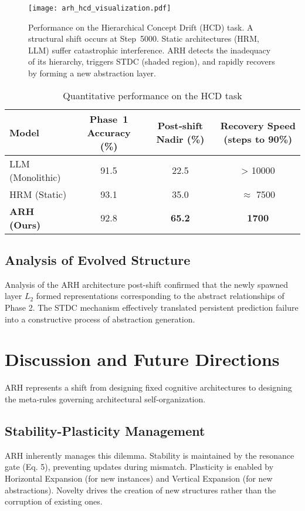 \documentclass{article}
\begin{document}
\begin{figure}[h!]
    \centering
    \texttt{[image: arh\_hcd\_visualization.pdf]}
    \caption{Performance on the Hierarchical Concept Drift (HCD) task. A structural shift occurs at Step~5000. Static architectures (HRM, LLM) suffer catastrophic interference. ARH detects the inadequacy of its hierarchy, triggers STDC (shaded region), and rapidly recovers by forming a new abstraction layer.}
    \label{fig:performance_plot}
\end{figure}

\begin{table}[h!]
\centering
\caption{Quantitative performance on the HCD task}
\begin{tabular}{@{}lccc@{}}
\toprule
Model & Phase~1 Accuracy (\%) & Post‑shift Nadir (\%) & Recovery Speed (steps to 90\%) \\
\midrule
LLM (Monolithic) & 91.5 & 22.5 & > 10000 \\
HRM (Static) & 93.1 & 35.0 & $\approx$ 7500 \\
\textbf{ARH (Ours)} & 92.8 & \textbf{65.2} & \textbf{1700} \\ %
\bottomrule
\end{tabular}
\label{tab:results_hcd}
\end{table}

\subsection{Analysis of Evolved Structure}
Analysis of the ARH architecture post-shift confirmed that the newly spawned layer $L_2$ formed representations corresponding to the abstract relationships of Phase 2. The STDC mechanism effectively translated persistent prediction failure into a constructive process of abstraction generation.

\section{Discussion and Future Directions}

ARH represents a shift from designing fixed cognitive architectures to designing the meta-rules governing architectural self-organization.

\subsection{Stability-Plasticity Management}
ARH inherently manages this dilemma. Stability is maintained by the resonance gate (Eq. 5), preventing updates during mismatch. Plasticity is enabled by Horizontal Expansion (for new instances) and Vertical Expansion (for new abstractions). Novelty drives the creation of new structures rather than the corruption of existing ones.
\end{document}
